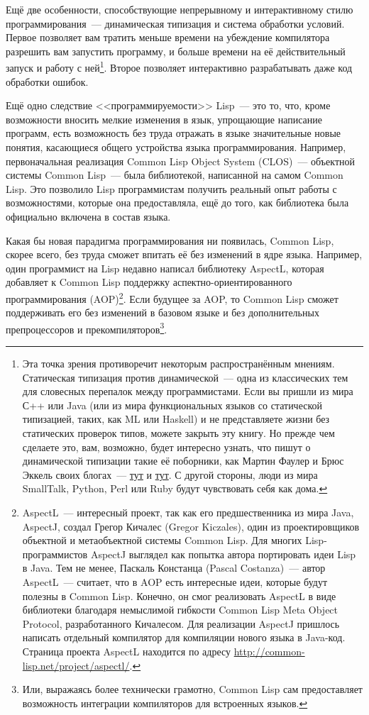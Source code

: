 Ещё две особенности, способствующие непрерывному и интерактивному стилю
программирования~--- динамическая типизация и система обработки условий.
Первое позволяет вам тратить меньше времени на убеждение компилятора разрешить вам
запустить программу, и больше времени на её действительный запуск и работу с
ней\footnote{Эта точка зрения противоречит некоторым распространённым мнениям. Статическая
  типизация против динамической~--- одна из классических тем для словесных перепалок между
  программистами. Если вы пришли из мира С++ или Java (или из мира функциональных языков
  со статической типизацией, таких, как ML или Haskell) и не представляете жизни без
  статических проверок типов, можете закрыть эту книгу. Но прежде чем сделаете это,
  вам, возможно, будет интересно узнать, что пишут о динамической типизации такие её
  поборники, как Мартин Фаулер и Брюс Эккель своих блогах~---
 \href{http://www.artima.com/weblogs/viewpost.jsp?thread=4639}{тут} 
  и
  \href{http://www.mindview.net/WebLog/log-0025}{тут}.
  С другой стороны, люди из мира
  SmallTalk, Python, Perl или Ruby будут чувствовать себя как дома.}. Второе позволяет
интерактивно разрабатывать даже код обработки ошибок.

Ещё одно следствие <<программируемости>> Lisp~--- это то, что, кроме
возможности вносить мелкие изменения в язык, упрощающие написание программ,
есть возможность без труда отражать в языке значительные новые понятия, касающиеся общего
устройства языка программирования. Например, первоначальная реализация Common Lisp Object
System (CLOS)~--- объектной системы Common Lisp~--- была библиотекой, написанной на самом
Common Lisp. Это позволило Lisp программистам получить реальный опыт работы с
возможностями, которые она предоставляла, ещё до того, как библиотека была
официально включена в состав языка.

Какая бы новая парадигма программирования ни появилась, Common Lisp, скорее всего, без
труда сможет впитать её без изменений в ядре языка. Например, один программист на Lisp
недавно написал библиотеку AspectL, которая добавляет к Common Lisp поддержку
аспектно-ориентированного программирования (AOP)\footnote{AspectL~--- интересный проект,
  так как его предшественника из мира Java, AspectJ, создал Грегор Кичалес (Gregor
  Kiczales), один из проектировщиков объектной и метаобъектной системы Common Lisp. Для
  многих Lisp-программистов AspectJ выглядел как попытка автора портировать идеи Lisp в
  Java. Тем не менее, Паскаль Констанца (Pascal Costanza)~--- автор AspectL~--- считает, что
  в AOP есть интересные идеи, которые будут полезны в Common Lisp. Конечно, он смог
  реализовать AspectL в виде библиотеки благодаря немыслимой гибкости Common Lisp Meta
  Object Protocol, разработанного Кичалесом. Для реализации AspectJ пришлось написать
  отдельный компилятор для компиляции нового языка в Java-код. Страница проекта AspectL
  находится по адресу \url{http://common-lisp.net/project/aspectl/}.}. Если будущее за
AOP, то Common Lisp сможет поддерживать его без изменений в базовом языке и без
дополнительных препроцессоров и прекомпиляторов\footnote{Или, выражаясь более технически
  грамотно, Common Lisp сам предоставляет возможность интеграции компиляторов
  для встроенных языков.}.

